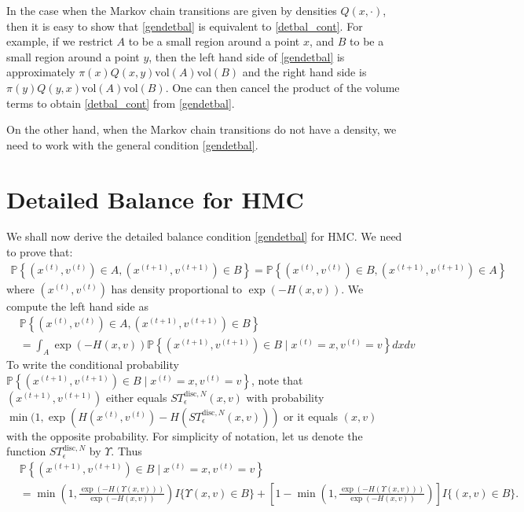 \documentclass{scrartcl}
\renewcommand{\P}{{\mathbb P}}
\begin{document}
In the case when the Markov chain transitions are given by densities
$Q(x, \cdot)$, then it is easy to show that \eqref{gendetbal} is
equivalent to \eqref{detbal_cont}. For example, if we restrict $A$ to
be a small region around a point $x$, and $B$ to be a small region
around a point $y$, then the left hand side of \eqref{gendetbal} is
approximately $\pi(x) Q(x, y) \text{vol}(A) \text{vol}(B)$ and the
right hand side is $\pi(y) Q(y, x) \text{vol}(A) \text{vol}(B)$. One
can then cancel the product of the volume terms to obtain
\eqref{detbal_cont} from \eqref{gendetbal}.

On the other hand, when the Markov chain transitions do not have a
density, we need to work with the general condition
\eqref{gendetbal}. 

\section{Detailed Balance for HMC}
We shall now derive the detailed balance condition \eqref{gendetbal}
for HMC. We need to prove that:
\begin{align}\label{hmc_detbal}
  \P \left\{(x^{(t)}, v^{(t)}) \in A, (x^{(t+1)}, v^{(t+1)}) \in B
  \right\} =   \P \left\{(x^{(t)}, v^{(t)}) \in B, (x^{(t+1)},
  v^{(t+1)}) \in A 
  \right\}
\end{align}
where $(x^{(t)}, v^{(t)})$ has density proportional to $\exp(-H(x,
v))$. We compute the left hand side as
\begin{align*}
 & \P \left\{(x^{(t)}, v^{(t)}) \in A, (x^{(t+1)}, v^{(t+1)}) \in B
  \right\} \\ &= \int_A \exp(-H(x, v)) \P \left\{(x^{(t+1)}, v^{(t+1)})
             \in B \mid x^{(t)} = x, v^{(t)} = v \right\} dx dv
\end{align*}
To write the conditional probability $\P \left\{(x^{(t+1)}, v^{(t+1)})
             \in B \mid x^{(t)} = x, v^{(t)} = v \right\}$, note that
           $(x^{(t+1)}, v^{(t+1)})$ either equals $S
           T_{\epsilon}^{\text{disc}, N}(x, v)$ with probability
             $\min(1, \exp(H(x^{(t)}, v^{(t)}) - H(S
           T_{\epsilon}^{\text{disc}, N}(x, v)))$ or it equals $(x,
             v)$ with the opposite probability. For simplicity of
             notation, let us denote the function $S
             T_{\epsilon}^{\text{disc}, N}$ by $\Upsilon$. Thus
\begin{align*}
&  \P \left\{(x^{(t+1)}, v^{(t+1)})
  \in B \mid x^{(t)} = x, v^{(t)} = v \right\} \\
&= \min \left(1,\frac{\exp(-H(\Upsilon(x, v)))}{\exp(-H(x, v))}
  \right)  I\{\Upsilon(x, v) \in B\} + \left[1 - \min
  \left(1,\frac{\exp(-H(\Upsilon(x, v)))}{\exp(-H(x, v))} 
  \right) \right] I\{(x, v) \in B\}. 
\end{align*}
\end{document}
